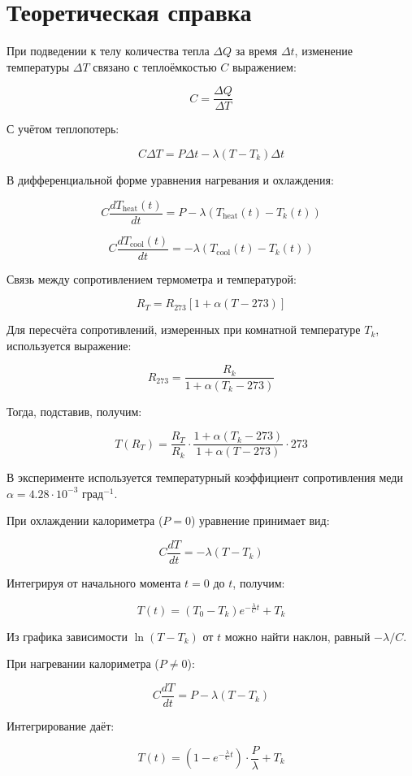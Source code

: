 \documentclass[a4paper,12pt]{article} %
\begin{document}
\section*{Теоретическая справка}

При подведении к телу количества тепла $\Delta Q$ за время $\Delta t$, изменение температуры $\Delta T$ связано с теплоёмкостью $C$ выражением:

\[
C = \frac{\Delta Q}{\Delta T}
\]

С учётом теплопотерь:

\[
C \Delta T = P \Delta t - \lambda (T - T_k) \Delta t
\]

В дифференциальной форме уравнения нагревания и охлаждения:

\[
C \frac{dT_{\text{heat}}(t)}{dt} = P - \lambda (T_{\text{heat}}(t) - T_k(t))
\]

\[
C \frac{dT_{\text{cool}}(t)}{dt} = -\lambda (T_{\text{cool}}(t) - T_k(t))
\]

Связь между сопротивлением термометра и температурой:

\[
R_T = R_{273} \left[ 1 + \alpha (T - 273) \right]
\]

Для пересчёта сопротивлений, измеренных при комнатной температуре $T_k$, используется выражение:

\[
R_{273} = \frac{R_k}{1 + \alpha (T_k - 273)}
\]

Тогда, подставив, получим:

\[
T(R_T) = \frac{R_T}{R_k} \cdot \frac{1 + \alpha (T_k - 273)}{1 + \alpha (T - 273)} \cdot 273
\]

В эксперименте используется температурный коэффициент сопротивления меди $\alpha = 4.28 \cdot 10^{-3}$ град$^{-1}$.

При охлаждении калориметра ($P = 0$) уравнение принимает вид:

\[
C \frac{dT}{dt} = -\lambda (T - T_k)
\]

Интегрируя от начального момента $t = 0$ до $t$, получим:

\[
T(t) = (T_0 - T_k) e^{-\frac{\lambda}{C}t} + T_k
\]

Из графика зависимости $\ln(T - T_k)$ от $t$ можно найти наклон, равный $-\lambda/C$.

При нагревании калориметра ($P \neq 0$):

\[
C \frac{dT}{dt} = P - \lambda (T - T_k)
\]

Интегрирование даёт:

\[
T(t) = \left(1 - e^{-\frac{\lambda}{C}t} \right) \cdot \frac{P}{\lambda} + T_k
\]
\end{document}
